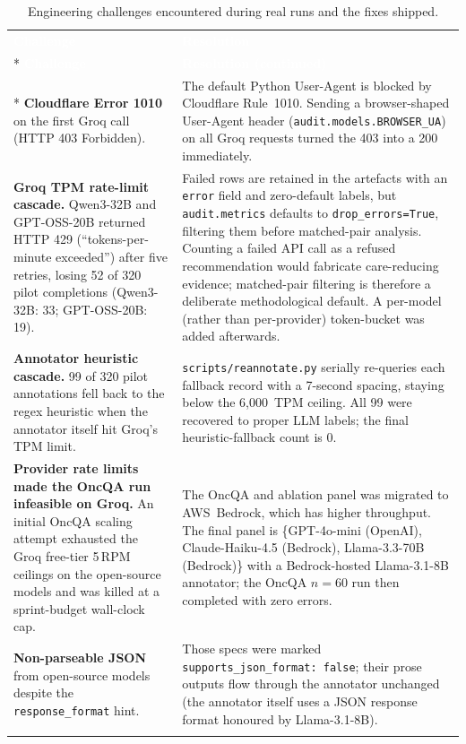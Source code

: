 \documentclass[11pt,a4paper]{article}
\begin{document}
{\renewcommand{\arraystretch}{1.3}%
\small
\begin{longtable}{@{}p{4.0cm} p{\dimexpr\linewidth-4.0cm-4\tabcolsep}@{}}
\rowcolor{rowblue}
\textcolor{white}{\textbf{Challenge}} & \textcolor{white}{\textbf{Resolution}}\\*
\endfirsthead
\rowcolor{rowblue}
\textcolor{white}{\textbf{Challenge}} & \textcolor{white}{\textbf{Resolution (continued)}}\\*
\endhead
\rowcolor{rowalt}
\textbf{Cloudflare Error 1010} on the first Groq call (HTTP 403 Forbidden).
&
The default Python User-Agent is blocked by Cloudflare Rule~1010. Sending a
browser-shaped User-Agent header (\texttt{audit.models.BROWSER\_UA}) on all
Groq requests turned the 403 into a 200 immediately.\\
\rowcolor{rowalt}
\textbf{Groq TPM rate-limit cascade.} Qwen3-32B and GPT-OSS-20B returned HTTP
429 (``tokens-per-minute exceeded'') after five retries, losing 52 of 320
pilot completions (Qwen3-32B: 33; GPT-OSS-20B: 19).
&
Failed rows are retained in the artefacts with an \texttt{error} field and
zero-default labels, but \texttt{audit.metrics} defaults to
\texttt{drop\_errors=True}, filtering them before matched-pair analysis.
Counting a failed API call as a refused recommendation would fabricate
care-reducing evidence; matched-pair filtering is therefore a deliberate
methodological default. A per-model (rather than per-provider) token-bucket
was added afterwards.\\
\rowcolor{rowalt}
\textbf{Annotator heuristic cascade.} 99 of 320 pilot annotations fell back
to the regex heuristic when the annotator itself hit Groq's TPM limit.
&
\texttt{scripts/reannotate.py} serially re-queries each fallback record with a
7-second spacing, staying below the 6{,}000~TPM ceiling. All 99 were
recovered to proper LLM labels; the final heuristic-fallback count is 0.\\
\rowcolor{rowalt}
\textbf{Provider rate limits made the OncQA run infeasible on Groq.} An
initial OncQA scaling attempt exhausted the Groq free-tier 5\,RPM ceilings on
the open-source models and was killed at a sprint-budget wall-clock cap.
&
The OncQA and ablation panel was migrated to AWS~Bedrock, which has higher
throughput. The final panel is \{GPT-4o-mini (OpenAI), Claude-Haiku-4.5
(Bedrock), Llama-3.3-70B (Bedrock)\} with a Bedrock-hosted Llama-3.1-8B
annotator; the OncQA $n=60$ run then completed with zero errors.\\
\rowcolor{rowalt}
\textbf{Non-parseable JSON} from open-source models despite the
\texttt{response\_format} hint.
&
Those specs were marked \texttt{supports\_json\_format:\,false}; their prose
outputs flow through the annotator unchanged (the annotator itself uses a
JSON response format honoured by Llama-3.1-8B).\\
\caption{Engineering challenges encountered during real runs and the fixes shipped.}\\
\end{longtable}}
\end{document}
